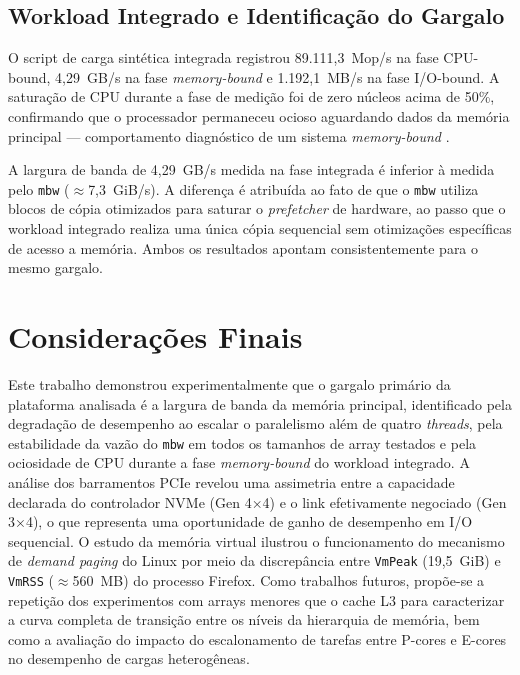 \documentclass[12pt]{article}
\begin{document}
\subsection{Workload Integrado e Identificação do Gargalo}

O script de carga sintética integrada registrou 89.111,3~Mop/s na fase CPU-bound, 4,29~GB/s na fase \textit{memory-bound} e 1.192,1~MB/s na fase I/O-bound. A saturação de CPU durante a fase de medição foi de zero núcleos acima de 50\%, confirmando que o processador permaneceu ocioso aguardando dados da memória principal — comportamento diagnóstico de um sistema \textit{memory-bound} \cite{williams2009}.

A largura de banda de 4,29~GB/s medida na fase integrada é inferior à medida pelo \texttt{mbw} ($\approx$7,3~GiB/s). A diferença é atribuída ao fato de que o \texttt{mbw} utiliza blocos de cópia otimizados para saturar o \textit{prefetcher} de hardware, ao passo que o workload integrado realiza uma única cópia sequencial sem otimizações específicas de acesso a memória. Ambos os resultados apontam consistentemente para o mesmo gargalo.

\section{Considerações Finais}
\label{sec:conc}

Este trabalho demonstrou experimentalmente que o gargalo primário da plataforma analisada é a largura de banda da memória principal, identificado pela degradação de desempenho ao escalar o paralelismo além de quatro \textit{threads}, pela estabilidade da vazão do \texttt{mbw} em todos os tamanhos de array testados e pela ociosidade de CPU durante a fase \textit{memory-bound} do workload integrado. A análise dos barramentos PCIe revelou uma assimetria entre a capacidade declarada do controlador NVMe (Gen 4×4) e o link efetivamente negociado (Gen 3×4), o que representa uma oportunidade de ganho de desempenho em I/O sequencial. O estudo da memória virtual ilustrou o funcionamento do mecanismo de \textit{demand paging} do Linux por meio da discrepância entre \texttt{VmPeak} (19,5~GiB) e \texttt{VmRSS} ($\approx$560~MB) do processo Firefox. Como trabalhos futuros, propõe-se a repetição dos experimentos com arrays menores que o cache L3 para caracterizar a curva completa de transição entre os níveis da hierarquia de memória, bem como a avaliação do impacto do escalonamento de tarefas entre P-cores e E-cores no desempenho de cargas heterogêneas.



\end{document}
